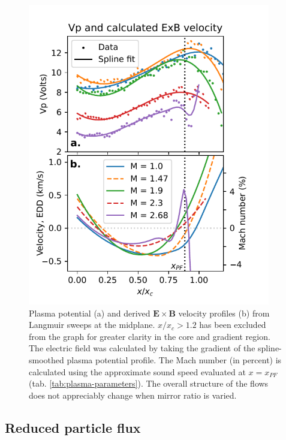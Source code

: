 \begin{figure}
    \centering
    \includegraphics[width=300pt]{figures/fig6.pdf}
    \caption{Plasma potential (a) and derived $\boldsymbol{E \times B}$ velocity profiles (b) from Langmuir sweeps at the midplane. $x/x_c > 1.2$ has been excluded from the graph for greater clarity in the core and gradient region. The electric field was calculated by taking the gradient of the spline-smoothed plasma potential profile. The Mach number (in percent) is calculated using the approximate sound speed evaluated at $x=x_{PF}$ (tab. \ref{tab:plasma-parameters}). The overall structure of the flows does not appreciably change when mirror ratio is varied.}
    \label{fig:Vp_ExB}
\end{figure}

\subsection{Reduced particle flux}


